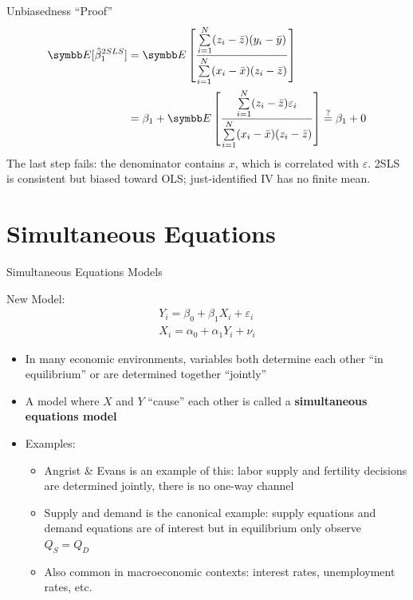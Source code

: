 \documentclass[aspectratio=169,11pt]{beamer}
\begin{document}
\begin{frame}{Unbiasedness ``Proof''}
\begin{align*}
\E[\hat{\beta}_1^{2SLS}]&=\E\left[\frac{\sum\limits_{i=1}^N(z_i-\bar{z})(y_i-\bar{y})}{\sum\limits_{i=1}^N(x_i-\bar{x})(z_i-\bar{z})} \right] \\
&=\beta_1 + \E\left[ \frac{\sum\limits_{i=1}^N(z_i-\bar{z})\varepsilon_i}{\sum\limits_{i=1}^N(x_i-\bar{x})(z_i-\bar{z})} \right] \overset{?}{=}\beta_1 + 0
\end{align*}
{\small The last step fails: the denominator contains $x$, which is correlated with $\varepsilon$. 2SLS is \alert{consistent but biased} toward OLS; just-identified IV has no finite mean.}
\end{frame}



\section{Simultaneous Equations}
\begin{frame}{Simultaneous Equations Models}

New Model:
\begin{align*}
	Y_i = \beta_0 + \beta_1 X_i + \varepsilon_i\\
	X_i = \alpha_0 + \alpha_1 Y_i + \nu_i
\end{align*}

\begin{itemize}
	\item In many economic environments, variables both determine each other ``in equilibrium'' or are determined together ``jointly''
	\item A model where $X$ and $Y$ ``cause'' each other	is called a {\bf simultaneous equations model}
	\item Examples:
		\begin{itemize}
			\item Angrist \& Evans is an example of this: labor supply and fertility decisions are determined jointly, there is no one-way channel
			\item Supply and demand is the canonical example: supply equations and demand equations are of interest but in equilibrium only observe $Q_S=Q_D$
			\item Also common in macroeconomic contexts: interest rates, unemployment rates, etc.
		\end{itemize}
\end{itemize}

\end{frame}
\end{document}
